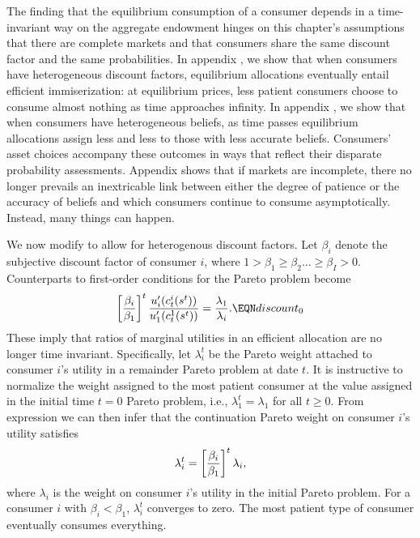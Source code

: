 \noindent
The  finding that the equilibrium consumption of a consumer
depends in a time-invariant way on the aggregate endowment hinges
 on this chapter's assumptions that there are  complete markets and  that
consumers  share the same  discount factor and the same probabilities.
In appendix , we show that when consumers have heterogeneous
discount factors,  equilibrium allocations eventually entail  efficient
 immiserization: at equilibrium prices,  less patient
consumers choose to consume almost nothing
as time approaches infinity.
In appendix , we show that when consumers have heterogeneous beliefs,  as  time passes  equilibrium allocations assign   less
and less  to those
with less accurate beliefs.
Consumers' asset choices accompany these outcomes in ways that reflect their disparate probability assessments.
Appendix  shows that if markets are incomplete, there no longer prevails an inextricable
link between  either the degree of patience or the
accuracy of beliefs and  which consumers continue to consume  asymptotically. Instead, many things can happen.




We now modify  to allow for heterogenous discount
factors.  Let $\beta_i$ denote
the subjective discount factor of consumer $i$, where
$1 > \beta_1\geq \beta_2 \ldots \geq \beta_I > 0$.
Counterparts to first-order conditions  for the
Pareto problem become
$$ \left[ \beta_i \over \beta_1 \right]^t
{u_i^\prime(c^i_t(s^t)) \over u_1^\prime(c^1_t(s^t))}
                   = {\lambda_1  \over \lambda_i}.  \EQN discount_0 $$
These imply that ratios of marginal utilities in an efficient allocation are no longer time invariant.
 Specifically, let $\lambda^t_i$ be the
Pareto weight attached to consumer $i$'s utility in a
remainder Pareto problem at date $t$. It is instructive to
normalize  the weight assigned to the
most patient consumer at the value assigned in the initial time $t=0$
Pareto problem, i.e., $\lambda^t_1 = \lambda_1$ for all $t\geq0$.
From expression  we can then infer that the continuation
Pareto weight on consumer $i$'s utility satisfies
$$
\lambda^t_i =  \left[ \beta_i \over \beta_1 \right]^t \lambda_i,
$$
where $\lambda_i$ is the weight on consumer $i$'s utility in the
initial Pareto problem.
For a consumer $i$ with  $\beta_i < \beta_1$, $\lambda^t_i$ converges to
zero.  The most patient type of consumer eventually
consumes everything.


